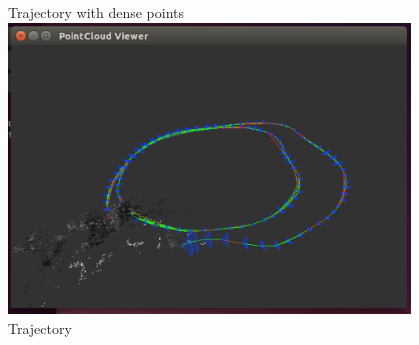 \documentclass[11pt, oneside]{article}   	%
\begin{document}
Trajectory with dense points\\
\includegraphics[width=0.8\textwidth]{i2}\\
Trajectory \\
\end{document}
